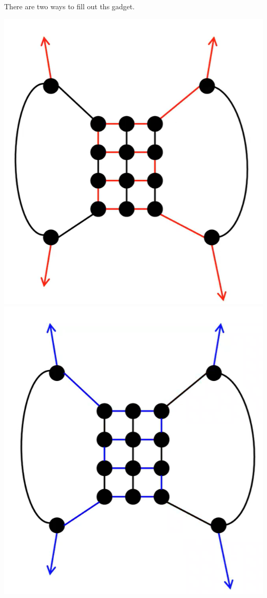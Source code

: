 \documentclass[letterpaper]{article}
\begin{document}
\begin{itemize}
\begin{center}
    \end{center}
    There are two ways to fill out ths gadget.
    \begin{center}
        \includegraphics[scale=0.30]{../assets/zoe_ham_9.png}
        \includegraphics[scale=0.30]{../assets/zoe_ham_10.png}

\end{center}
\end{itemize}
\end{document}
